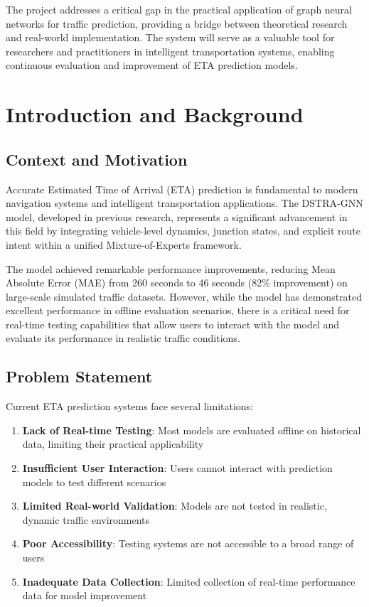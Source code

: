 \documentclass[12pt,a4paper]{article}
\begin{document}
The project addresses a critical gap in the practical application of graph neural networks for traffic prediction, providing a bridge between theoretical research and real-world implementation. The system will serve as a valuable tool for researchers and practitioners in intelligent transportation systems, enabling continuous evaluation and improvement of ETA prediction models.

\section{Introduction and Background}

\subsection{Context and Motivation}

Accurate Estimated Time of Arrival (ETA) prediction is fundamental to modern navigation systems and intelligent transportation applications. The DSTRA-GNN model, developed in previous research, represents a significant advancement in this field by integrating vehicle-level dynamics, junction states, and explicit route intent within a unified Mixture-of-Experts framework.

The model achieved remarkable performance improvements, reducing Mean Absolute Error (MAE) from 260 seconds to 46 seconds (82\% improvement) on large-scale simulated traffic datasets. However, while the model has demonstrated excellent performance in offline evaluation scenarios, there is a critical need for real-time testing capabilities that allow users to interact with the model and evaluate its performance in realistic traffic conditions.

\subsection{Problem Statement}

Current ETA prediction systems face several limitations:

\begin{enumerate}
    \item \textbf{Lack of Real-time Testing}: Most models are evaluated offline on historical data, limiting their practical applicability
    \item \textbf{Insufficient User Interaction}: Users cannot interact with prediction models to test different scenarios
    \item \textbf{Limited Real-world Validation}: Models are not tested in realistic, dynamic traffic environments
    \item \textbf{Poor Accessibility}: Testing systems are not accessible to a broad range of users
    \item \textbf{Inadequate Data Collection}: Limited collection of real-time performance data for model improvement
\end{enumerate}
\end{document}
